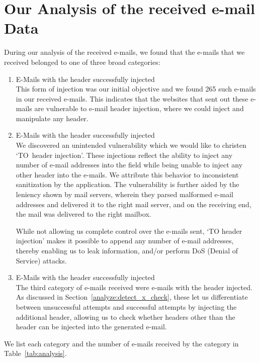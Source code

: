 \section[Analysis of Data]{Our Analysis of the received e-mail Data}
During our analysis of the received e-mails, we found that the e-mails that we received belonged to one of three broad categories:
\begin{enumerate}
	\item E-Mails with the  header successfully injected\\
	This form of injection was our initial objective and we found 265 such e-mails in our received e-mails. This indicates that the websites that sent out these e-mails are vulnerable to e-mail header injection, where we could inject and manipulate any header.
	
	\item E-Mails with the  header successfully injected\\
	We discovered an unintended vulnerability which we would like to christen `TO~header injection'. These injections reflect the ability to inject any number of e-mail addresses into the  field while being unable to inject any other header into the e-mails. We attribute this behavior to inconsistent sanitization by the application. 
	The vulnerability is further aided by the leniency shown by mail servers, wherein they parsed malformed e-mail addresses and delivered it to the right mail server, and on the receiving end, the mail was delivered to the right mailbox. 
	
	While not allowing us complete control over the e-mails sent, `TO header injection' makes it possible to append any number of e-mail addresses, thereby enabling us to leak information, and/or perform DoS (Denial of Service) attacks.
	
	\item E-Mails with the  header successfully injected\\
    The third category of e-mails received were e-mails with the  header injected. As discussed in Section~\ref{analyze:detect_x_check}, 
    these let us differentiate between unsuccessful attempts and successful attempts by injecting the additional header, allowing us to check whether headers other than the  header can be injected into the generated e-mail. 
\end{enumerate}
We list each category and the number of e-mails received by the category in Table~\ref{tab:analysis}. 

